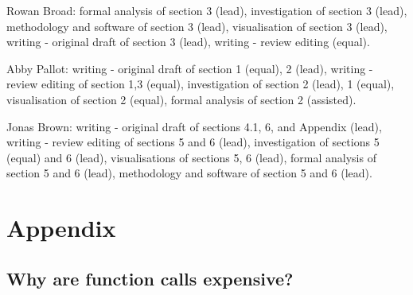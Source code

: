 \documentclass[10pt]{article}
\begin{document}
\begin{flushleft}
Rowan Broad: formal analysis of section 3 (lead), investigation of section 3 (lead), methodology and software of section 3 (lead), visualisation of section 3 (lead), writing - original draft of section 3 (lead), writing - review editing (equal).
\newline

Abby Pallot: writing - original draft of section 1 (equal), 2 (lead), writing - review editing of section 1,3 (equal), investigation of section 2 (lead), 1 (equal), visualisation of section 2 (equal), formal analysis of section 2 (assisted).
\newline

Jonas Brown: writing - original draft of sections 4.1, 6, and Appendix (lead), writing - review editing of sections 5 and 6 (lead), investigation of sections 5 (equal) and 6 (lead), visualisations of sections 5, 6 (lead), formal analysis of section 5 and 6 (lead), methodology and software of section 5 and 6 (lead).
    
    
    \section*{Appendix}
    \subsection*{Why are function calls expensive? \cite{function calls}}\label{sec:why-are-function-calls-expensive}


\end{flushleft}
\end{document}
